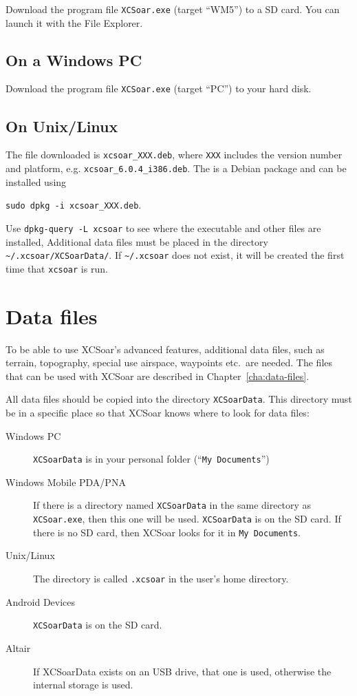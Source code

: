 Download the program file \verb|XCSoar.exe| (target ``WM5'') to a SD
card.  You can launch it with the File Explorer.

\subsection*{On a Windows PC}

Download the program file \verb|XCSoar.exe| (target ``PC'') to your
hard disk.

\subsection*{On Unix/Linux}

The file downloaded is \verb|xcsoar_XXX.deb|, where \verb|XXX| includes
the version number and platform, e.g. \verb|xcsoar_6.0.4_i386.deb|.
The is a Debian package and can be installed using 
\begin{center}
\verb|sudo dpkg -i xcsoar_XXX.deb|.
\end{center}
Use \verb|dpkg-query -L xcsoar| to see where the executable and 
other files are installed,
Additional data files must be placed in the directory
\verb|~/.xcsoar/XCSoarData/|.
If \verb|~/.xcsoar| does not exist, it will be created the first time
that \verb|xcsoar| is run.


\section{Data files}

To be able to use XCSoar's advanced features, additional data files, such as
terrain, topography, special use airspace, waypoints etc.\ are needed. The files
that can be used with XCSoar are described in Chapter~\ref{cha:data-files}.

All data files should be copied into the directory
\texttt{XCSoarData}.  This directory must be in a specific place
so that XCSoar knows where to look for data files:

\begin{description}
\item[Windows PC]
\texttt{XCSoarData} is in your personal folder (``\texttt{My
Documents}'')
\item[Windows Mobile PDA/PNA]
If there is a directory named \texttt{XCSoarData} in the same
directory as \texttt{XCSoar.exe}, then this one will be used.
\texttt{XCSoarData} is on the SD card.  If there is no SD card, then
XCSoar looks for it in \texttt{My Documents}.
\item[Unix/Linux]
The directory is called \verb|.xcsoar| in the user's home directory.
\item[Android Devices]
\texttt{XCSoarData} is on the SD card.
\item[Altair]
If XCSoarData exists on an USB drive, that one is used, otherwise the
internal storage is used.
\end{description}


